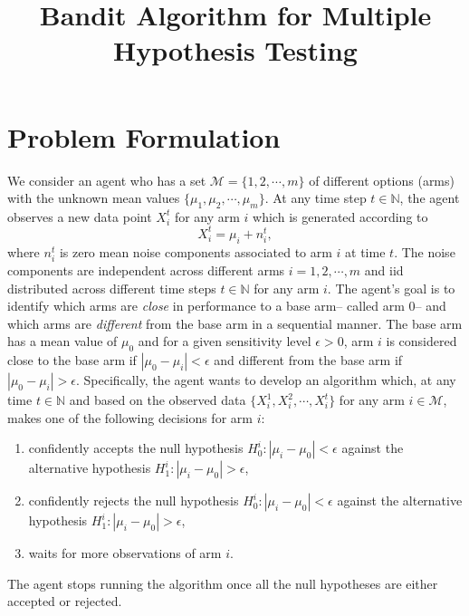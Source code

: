 \documentclass[12pt]{article}
\title{Bandit Algorithm for Multiple Hypothesis Testing}
\author{}
\date{}
\def\N{\mathbb{N}}
\def\N{\mathbb{N}}
\def\MM{\mathcal{M}}
\begin{document}
\maketitle


\section{Problem Formulation}
We consider an agent who has a set $\MM = \{1,2,\cdots,m\}$ of different options (arms) with the unknown mean values $\{\mu_1,\mu_2,\cdots,\mu_m\}$. At any time step $t\in\N$, the agent observes a new data point $X^t_i$ for any arm $i$ which is generated according to
\begin{equation}
\label{model1}
X^t_i = \mu_i + n^t_i,
\end{equation}
where $n^t_i$ is zero mean noise components associated to arm $i$ at time $t$. The noise components are independent across different arms $i = 1,2,\cdots,m$ and iid distributed across different time steps $t \in\N$ for any arm $i$. The agent's goal is to identify which  arms are {\em close} in performance to a base arm-- called arm 0-- and which arms are {\em different} from the base arm in a sequential manner. The base arm has a mean value of $\mu_0$ and for a given sensitivity level $\epsilon>0$, arm $i$ is considered close to the base arm if $|\mu_0-\mu_i|< \epsilon$ and different from the base arm if $|\mu_0-\mu_i|>\epsilon$. 
Specifically, the agent wants to develop an algorithm which, at any time $t\in\N$ and  based on the observed data $\{X_i^1,X_i^2,\cdots,X_i^t\}$ for any arm $i\in\MM$, makes one of the following decisions for arm $i$: 
\begin{enumerate}
\item confidently accepts the null hypothesis $H_0^i:|\mu_i-\mu_0|< \epsilon$ against the alternative hypothesis $H^i_1:|\mu_i-\mu_0|> \epsilon$,
\item confidently rejects the null hypothesis $H_0^i:|\mu_i-\mu_0|< \epsilon$ against the alternative hypothesis $H^i_1:|\mu_i-\mu_0|> \epsilon$,
\item waits for more observations of arm $i$.
\end{enumerate}
The agent stops running the algorithm once all the null hypotheses are either accepted or rejected.
\end{document}
